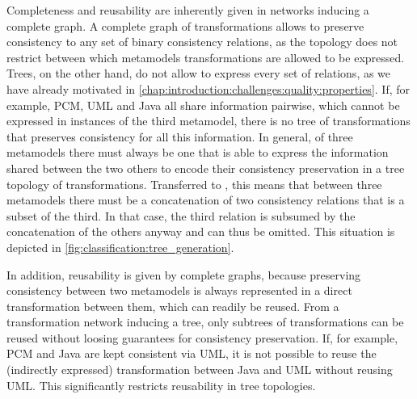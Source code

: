 Completeness and reusability are inherently given in networks inducing a complete graph.
A complete graph of transformations allows to preserve consistency to any set of binary consistency relations, as the topology does not restrict between which metamodels transformations are allowed to be expressed.
Trees, on the other hand, do not allow to express every set of relations, as we have already motivated in \autoref{chap:introduction:challenges:quality:properties}.
If, for example, \gls{PCM}, \gls{UML} and Java all share information pairwise, which cannot be expressed in instances of the third metamodel, there is no tree of transformations that preserves consistency for all this information.
In general, of three metamodels there must always be one that is able to express the information shared between the two others to encode their consistency preservation in a tree topology of transformations.
Transferred to \modellevelconsistencyrelations, this means that between three metamodels there must be a concatenation of two consistency relations that is a subset of the third.
In that case, the third relation is subsumed by the concatenation of the others anyway and can thus be omitted.
This situation is depicted in \autoref{fig:classification:tree_generation}.

In addition, reusability is given by complete graphs, because preserving consistency between two metamodels is always represented in a direct transformation between them, which can readily be reused.
From a transformation network inducing a tree, only subtrees of transformations can be reused without loosing guarantees for consistency preservation.
If, for example, \gls{PCM} and Java are kept consistent via \gls{UML}, it is not possible to reuse the (indirectly expressed) transformation between Java and \gls{UML} without reusing \gls{UML}.
This significantly restricts reusability in tree topologies.


